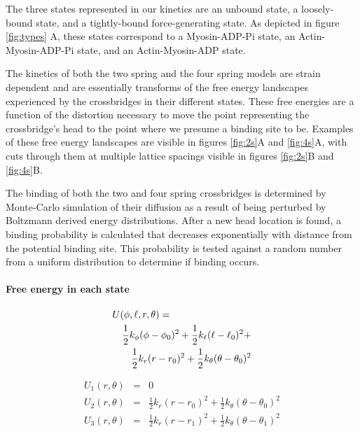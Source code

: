\documentclass[]{article}
\begin{document}
The three states represented in our kinetics are an unbound state, a loosely-bound state, and a tightly-bound force-generating state.
As depicted in figure \ref{fig:types} A, these states correspond to a Myosin-ADP-Pi state, an Actin-Myosin-ADP-Pi state, and an Actin-Myosin-ADP state.

The kinetics of both the two spring and the four spring models are strain dependent and are essentially transforms of the free energy landscapes experienced by the crossbridges in their different states.
These free energies are a function of the distortion necessary to move the point representing the crossbridge's head to the point where we presume a binding site to be.
Examples of these free energy landscapes are visible in figures \ref{fig:2s}A and \ref{fig:4s}A, with cuts through them at multiple lattice spacings visible in figures \ref{fig:2s}B and \ref{fig:4s}B.

The binding of both the two and four spring crossbridges is determined by Monte-Carlo simulation of their diffusion as a result of being perturbed by Boltzmann derived energy distributions. 
After a new head location is found, a binding probability is calculated that decreases exponentially with distance from the potential binding site. 
This probability is tested against a random number from a uniform distribution to determine if binding occurs.

\paragraph{Free energy in each state} %

\begin{eqnarray}
	\lefteqn{U(\phi,\ell,r,\theta) = }  \nonumber \\
 	& & \frac{1}{2}k_\phi (\phi-\phi_0)^2 + \frac{1}{2}k_\ell (\ell-\ell_0)^2 + \nonumber \\
	& & \frac{1}{2}k_r (r-r_0)^2 + \frac{1}{2}k_\theta (\theta-\theta_0)^2
\end{eqnarray}

\begin{eqnarray}
\label{2sEnergy}
	U_1(r,\theta) & = & 0 \nonumber \\
    U_2(r,\theta) & = & \frac{1}{2}k_r (r - r_0)^2 + 
                        \frac{1}{2}k_\theta (\theta - \theta_0)^2 \nonumber \\
    U_3(r,\theta) & = & \frac{1}{2}k_r (r - r_1)^2 + 
                        \frac{1}{2}k_\theta (\theta - \theta_1)^2 \\
\end{eqnarray}
\end{document}
